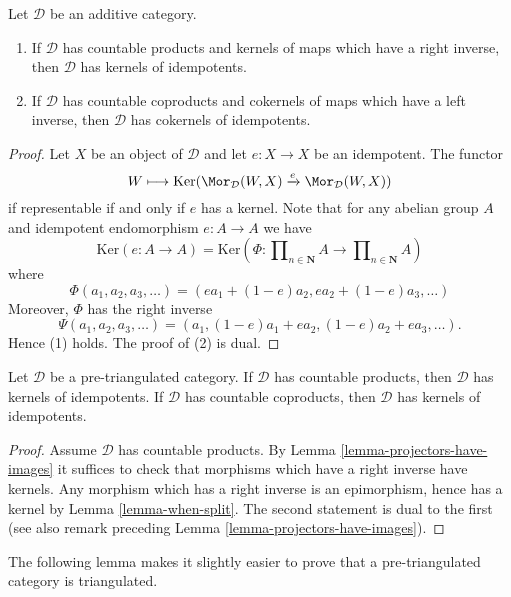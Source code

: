 \begin{lemma}
\label{lemma-projectors-have-images}
Let $\mathcal{D}$ be an additive category.
\begin{enumerate}
\item If $\mathcal{D}$ has countable products
and kernels of maps which have a right inverse, then $\mathcal{D}$
has kernels of idempotents.
\item If $\mathcal{D}$ has countable coproducts and cokernels of
maps which have a left inverse, then $\mathcal{D}$ has cokernels of
idempotents.
\end{enumerate}
\end{lemma}

\begin{proof}
Let $X$ be an object of $\mathcal{D}$ and let $e : X \to X$ be an idempotent.
The functor
$$
W \longmapsto \text{Ker}(
\Mor_\mathcal{D}(W, X)
\xrightarrow{e}
\Mor_\mathcal{D}(W, X)
)
$$
if representable if and only if $e$ has a kernel. Note that for any
abelian group $A$ and idempotent endomorphism $e : A \to A$ we have
$$
\text{Ker}(e : A \to A)
= \text{Ker}(\Phi :
\prod\nolimits_{n \in \mathbf{N}} A
\to
\prod\nolimits_{n \in \mathbf{N}} A
)
$$
where
$$
\Phi(a_1, a_2, a_3, \ldots) = (ea_1 + (1 - e)a_2, ea_2 + (1 - e)a_3, \ldots)
$$
Moreover, $\Phi$ has the right inverse
$$
\Psi(a_1, a_2, a_3, \ldots) =
(a_1, (1 - e)a_1 + ea_2, (1 - e)a_2 + ea_3, \ldots).
$$
Hence (1) holds. The proof of (2) is dual.
\end{proof}

\begin{lemma}
\label{lemma-projectors-have-images-triangulated}
Let $\mathcal{D}$ be a pre-triangulated category.
If $\mathcal{D}$ has countable products, then $\mathcal{D}$
has kernels of idempotents.
If $\mathcal{D}$ has countable coproducts, then $\mathcal{D}$
has kernels of idempotents.
\end{lemma}

\begin{proof}
Assume $\mathcal{D}$ has countable products. By
Lemma \ref{lemma-projectors-have-images} it suffices to
check that morphisms which have a right inverse have kernels.
Any morphism which has a right inverse is an epimorphism, hence
has a kernel by
Lemma \ref{lemma-when-split}.
The second statement is dual to the first (see also remark
preceding Lemma \ref{lemma-projectors-have-images}).
\end{proof}

\noindent
The following lemma makes it slightly easier to prove that a
pre-triangulated category is triangulated.

